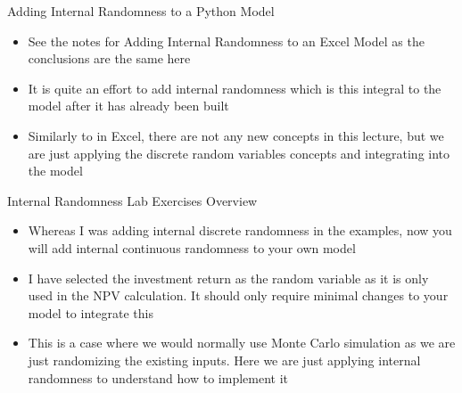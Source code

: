 \documentclass[]{article}
\begin{document}
\begin{section}{Adding Internal Randomness to a Python Model}
\begin{itemize}
\item See the notes for Adding Internal Randomness to an Excel Model as the conclusions are the same here
\item It is quite an effort to add internal randomness which is this integral to the model after it has already been built
\item Similarly to in Excel, there are not any new concepts in this lecture, but we are just applying the discrete random variables concepts and integrating into the model
\end{itemize}
\end{section}
\begin{section}{Internal Randomness Lab Exercises Overview}
\begin{itemize}
\item Whereas I was adding internal discrete randomness in the examples, now you will add internal continuous randomness to your own model
\item I have selected the investment return as the random variable as it is only used in the NPV calculation. It should only require minimal changes to your model to integrate this
\item This is a case where we would normally use Monte Carlo simulation as we are just randomizing the existing inputs. Here we are just applying internal randomness to understand how to implement it
\end{itemize}
\end{section}
\end{document}
